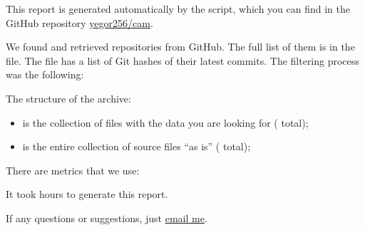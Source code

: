 \documentclass[nobrand,nosecurity]{huawei}
\begin{document}
\maketitle

This report is generated automatically by the script, which you can find in
the GitHub repository \href{https://github.com/yegor256/cam}{yegor256/cam}.

We found and retrieved 
repositories from GitHub.
The full list of them is in the  file.
The  file has a list of Git hashes of their latest commits.
The filtering process was the following:

\begin{enumerate}
\end{enumerate}

The structure of the archive:

\begin{itemize}
  \item {} is the collection of  files with the data
  you are looking for ( total);

  \item {} is the entire collection of
  source files ``as is''
  ( total);
\end{itemize}

There are  metrics that we use:

\begin{itemize}
  
\end{itemize}

It took  hours
to generate this report.

If any questions or suggestions, just \href{mailto:yegor256@gmail.com}{email me}.
\end{document}
